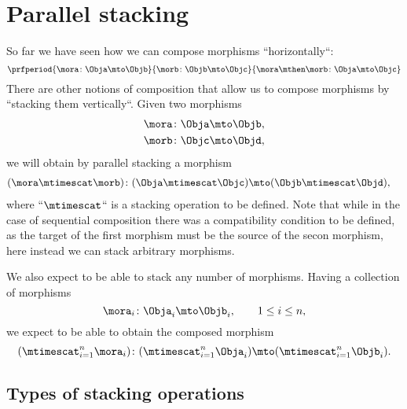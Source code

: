 
\section{Parallel stacking}
\label{sec:parallel-stacking}

So far we have seen how we can compose morphisms ``horizontally``:
%
\begin{equation}
    \prfperiod{
        \mora \colon \Obja \mto \Objb
    }{
        \morb\colon \Objb \mto \Objc
    }{
        \mora \mthen \morb \colon \Obja \mto \Objc
    }
\end{equation}
%
There are other notions of composition that allow us to compose morphisms by ``stacking them vertically``.
Given two morphisms
%
\begin{align}
    \mora & \colon \Obja \mto \Objb, \\
    \morb & \colon \Objc \mto \Objd,
\end{align}
%
we will obtain by parallel stacking a morphism
%
\begin{align}
    (\mora\mtimescat \morb)
     & \colon (\Obja \mtimescat \Objc) \mto (\Objb \mtimescat \Objd),
\end{align}
%
where ``$\mtimescat$`` is a stacking operation to be defined.
Note that while in the case of sequential composition there was a compatibility condition to be defined, as the target of the first morphism must be the source of the secon morphism, here instead we can stack arbitrary morphisms.

We also expect to be able to stack any number of morphisms.
Having a collection of morphisms
%
\begin{equation}
    \mora_i \colon \Obja_i \mto \Objb_i, \qquad 1 \leq i \leq n,
\end{equation}
%
we expect to be able to obtain the composed morphism
%
\begin{equation}
    (\mtimescat_{i=1}^n  \mora_i )
    \colon( \mtimescat_{i=1}^n  \Obja_i )\mto (\mtimescat_{i=1}^n  \Objb_i).
\end{equation}

\subsection{Types of stacking operations}

